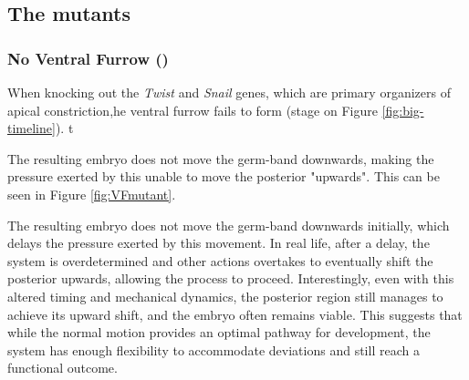 \subsection{The mutants}


\subsubsection{No Ventral Furrow ()}
When knocking out the \textit{Twist} and \textit{Snail} genes, which are primary organizers of apical constriction,he ventral furrow fails to form (stage  on Figure \ref{fig:big-timeline}).\cite{leptin1991twist} t

The resulting embryo does not move the germ-band downwards, making the pressure exerted by this unable to move the posterior "upwards". This can be  seen in Figure \ref{fig:VFmutant}.\\


The resulting embryo does not move the germ-band downwards initially, which delays the pressure exerted by this movement. In real life, after a delay, the system is overdetermined and other actions overtakes to eventually shift the posterior upwards, allowing the process to proceed. Interestingly, even with this altered timing and mechanical dynamics, the posterior region still manages to achieve its upward shift, and the embryo often remains viable.\cite{conte2012biomechanical} This suggests that while the normal motion provides an optimal pathway for development, the system has enough flexibility to accommodate deviations and still reach a functional outcome.








